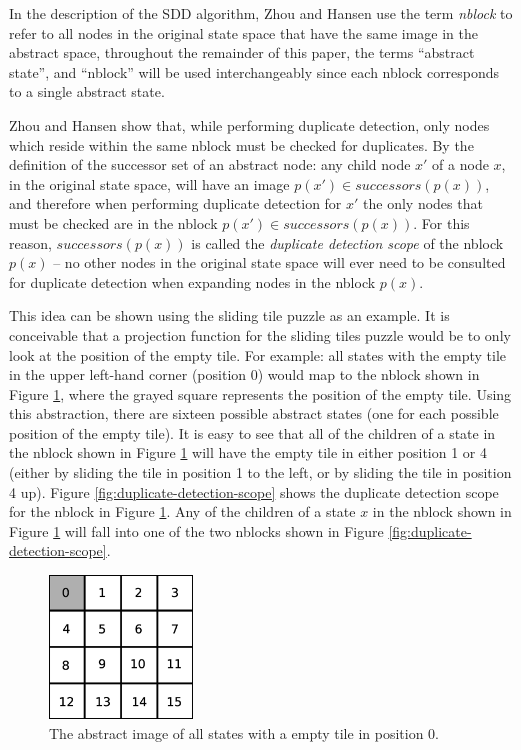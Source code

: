 \documentclass{article} \usepackage{aaai} \usepackage{graphicx}
\begin{document}
In the description of the SDD algorithm, Zhou and Hansen use the term
\emph{nblock} to refer to all nodes in the original state space that
have the same image in the abstract space, throughout the remainder of
this paper, the terms ``abstract state'', and ``nblock'' will be used
interchangeably since each nblock corresponds to a single abstract
state.

Zhou and Hansen show that, while performing duplicate detection, only
nodes which reside within the same nblock must be checked for
duplicates.  By the definition of the successor set of an abstract
node: any child node $x'$ of a node $x$, in the original state space,
will have an image $p(x') \in successors(p(x))$, and therefore when
performing duplicate detection for $x'$ the only nodes that must be
checked are in the nblock $p(x') \in successors(p(x))$.  For this
reason, $successors(p(x))$ is called the \emph{duplicate detection
  scope} of the nblock $p(x)$ -- no other nodes in the original state
space will ever need to be consulted for duplicate detection when
expanding nodes in the nblock $p(x)$.

This idea can be shown using the sliding tile puzzle as an example.
It is conceivable that a projection function for the sliding tiles
puzzle would be to only look at the position of the empty tile.  For
example: all states with the empty tile in the upper left-hand corner
(position 0) would map to the nblock shown in Figure
\ref{fig:tile-abstraction}, where the grayed square represents the
position of the empty tile.  Using this abstraction, there are sixteen
possible abstract states (one for each possible position of the empty
tile).  It is easy to see that all of the children of a state in the
nblock shown in Figure \ref{fig:tile-abstraction} will have the empty
tile in either position 1 or 4 (either by sliding the tile in position
1 to the left, or by sliding the tile in position 4 up).  Figure
\ref{fig:duplicate-detection-scope} shows the duplicate detection
scope for the nblock in Figure \ref{fig:tile-abstraction}.  Any of the
children of a state $x$ in the nblock shown in Figure
\ref{fig:tile-abstraction} will fall into one of the two nblocks shown
in Figure \ref{fig:duplicate-detection-scope}.

\begin{figure}[t]
\begin{center}
\includegraphics[width=1.5in]{images/tile-abstraction.eps}
\caption{The abstract image of all states with a empty tile in
  position 0.}
\label{fig:tile-abstraction}
\end{center}
\end{figure}
\end{document}
